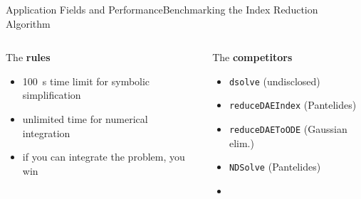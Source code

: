 \begin{frame}{Application Fields and Performance}{Benchmarking the Index Reduction Algorithm}
  \vspace{-1.5em}
  \begin{columns}
    \begin{column}[t]{0.5\textwidth}
      The \textbf{rules}
      \begin{itemize}\small
        \setlength{\itemsep}{0.0em}
        \item[\raisebox{-1pt}{\scalebox{0.8}{\faHourglassHalf}\,}] \SI{100}{\second} time limit for symbolic simplification
        \item[\raisebox{-1pt}{\scalebox{0.8}{\faInfinity}}] unlimited time for numerical integration
        \item[\raisebox{-1pt}{\scalebox{0.8}{\faCheck}}] if you can integrate the problem, you win
      \end{itemize}
    \end{column}
    \begin{column}[t]{0.5\textwidth}
      The \textbf{competitors} \\
      \begin{itemize}\small
        \setlength{\itemsep}{0.0em}
        \item \Maple{} \texttt{dsolve} (undisclosed)
        \item \Matlab{} \texttt{reduceDAEIndex} (Pantelides)
        \item \Matlab{} \texttt{reduceDAEToODE} (Gaussian elim.)
        \item \Mathematica{} \texttt{NDSolve} (Pantelides)
        \item {}
      \end{itemize}
    \end{column}
  \end{columns}
  \vspace{0.5em}%
\end{frame}
